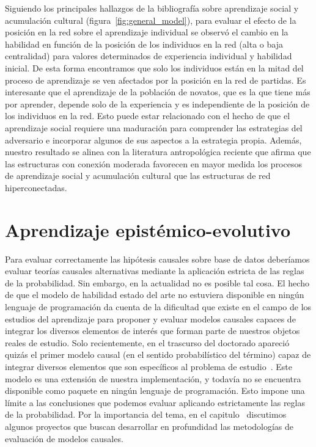 \documentclass[a4paper,11pt]{book}
\theoremstyle{definition}
\begin{document}

Siguiendo los principales hallazgos de la bibliograf\'ia sobre aprendizaje social y acumulaci\'on cultural (figura~\ref{fig:general_model}), para evaluar el efecto de la posici\'on en la red sobre el aprendizaje individual se observ\'o el cambio en la habilidad en funci\'on de la posici\'on de los individuos en la red (alta o baja centralidad) para valores determinados de experiencia individual y habilidad inicial.
%
De esta forma encontramos que solo los individuos est\'an en la mitad del proceso de aprendizaje se ven afectados por la posici\'on en la red de partidas.
%
Es interesante que el aprendizaje de la poblaci\'on de novatos, que es la
que tiene m\'as por aprender, depende solo de la experiencia y es independiente de la posici\'on de los individuos en la red.
%
Esto puede estar relacionado con el hecho de que el aprendizaje social requiere una maduraci\'on para comprender las estrategias del adversario e incorporar algunos de sus aspectos a la estrategia propia.
%
Adem\'as, nuestro resultado se alinea con la literatura antropol\'ogica reciente que afirma que las estructuras con conexi\'on moderada favorecen en mayor medida los procesos de aprendizaje social y acumulaci\'on cultural que las estructuras de red hiperconectadas.

\section{Aprendizaje epist\'emico-evolutivo}

Para evaluar correctamente las hip\'otesis causales sobre base de datos deber\'iamos evaluar teor\'ias causales alternativas mediante la aplicaci\'on estricta de las reglas de la probabilidad.
%
Sin embargo, en la actualidad no es posible tal cosa.
%
El hecho de que el modelo de habilidad estado del arte no estuviera disponible en ning\'un lenguaje de programaci\'on da cuenta de la dificultad que existe en el campo de los estudios del aprendizaje para proponer y evaluar modelos causales capaces de integrar los diversos elementos de inter\'es que forman parte de nuestros objetos reales de estudio.
%
Solo recientemente, en el trascurso del doctorado apareci\'o quiz\'as el primer modelo causal (en el sentido probabil\'istico del t\'ermino) capaz de integrar diversos elementos que son espec\'ificos al problema de estudio~\cite{minka2018-trueskill2}.
%
Este modelo es una extensi\'on de nuestra implementaci\'on, y todav\'ia no se encuentra disponible como paquete en ning\'un lenguaje de programaci\'on.
%
Esto impone una l\'imite a las conclusiones que podemos evaluar aplicando estrictamente las reglas de la probabilidad.
%
Por la importancia del tema, en el capitulo~\emph{} discutimos algunos proyectos que buscan desarrollar en profundidad las metodolog\'ias de evaluaci\'on de modelos causales.
\end{document}
